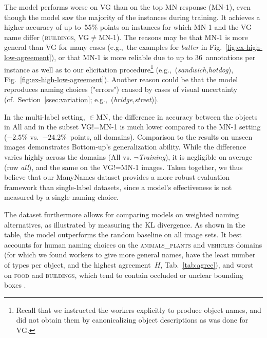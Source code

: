 The model performs worse on VG than on the top MN response (MN-1), even though the model saw the majority of the instances during training. 
It achieves a higher accuracy of up to\ 55\% points on instances for which MN-1 and the VG name differ (\textsc{buildings}, VG$\neq$MN-1). 
The reasons may be that MN-1 is more general than VG for many cases (e.g.,\ the examples for \textsl{batter} in Fig.\ \ref{fig:ex-high-low-agreement}), or that MN-1 is more reliable due to up to $36$~annotations per instance as well as to our elicitation procedure\footnote{Recall that we instructed the workers explicitly to produce object names, and did not obtain them by canonicalizing object descriptions as was done for VG.} (e.g.,\ (\textsl{sandwich,hotdog}), Fig.\ \ref{fig:ex-high-low-agreement}). 
Another reason could be that the model reproduces naming choices ("errors") caused by cases of visual uncertainty (cf.\ Section\ \ref{ssec:variation}; e.g.,\ (\textsl{bridge,street})). 

In the multi-label setting, $\in$MN, the difference in accuracy between the objects in All and in the subset VG!=MN-1 is much lower compared to the MN-1 setting ($-2.5$\% vs.\ $-24.2$\%\ points, all domains). 
Comparison to the results on unseen images demonstrates Bottom-up's generalization ability. 
While the difference varies highly across the domains (All vs. \mbox{$\neg$\textit{Training}}), it is negligible on average (row \textit{all}), and the same on the \mbox{VG!=MN-1} images. 
Taken together, we thus believe that our ManyNames dataset provides a more robust evaluation framework than single-label datasets, since a model's effectiveness is not measured by a single naming choice. 

The dataset furthermore allows for comparing models on weighted naming alternatives, as illustrated by measuring the KL divergence. 
As shown in the table, the model outperforms the random baseline on all image sets. 
It best accounts for human naming choices on the \textsc{animals\_plants} and \textsc{vehicles} domains (for which we found workers to give more general names, have the least number of types per object, and the highest agreement\ $H$, Tab.\ \ref{tab:agree}), and worst on \textsc{food} and \textsc{buildings}, which tend to contain occluded or unclear bounding boxes . 

